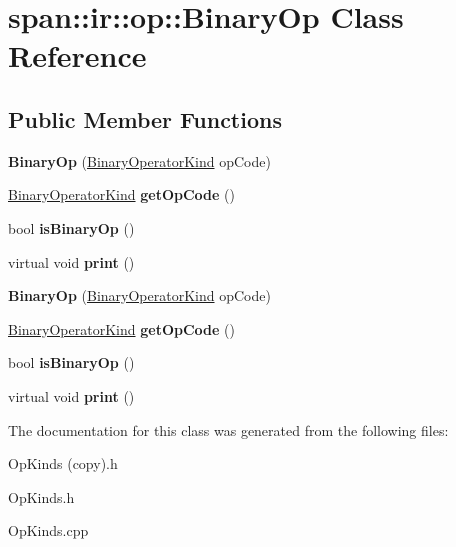 \hypertarget{classspan_1_1ir_1_1op_1_1BinaryOp}{}\section{span\+:\+:ir\+:\+:op\+:\+:Binary\+Op Class Reference}
\label{classspan_1_1ir_1_1op_1_1BinaryOp}
\subsection*{Public Member Functions}
\begin{DoxyCompactItemize}
\item 
\mbox{\label{classspan_1_1ir_1_1op_1_1BinaryOp_aac42587a58c175f840f119b184bdc250}} 
{\bfseries Binary\+Op} (\hyperlink{namespacespan_1_1ir_1_1op_a5741ac4595bea9e1d2821a8bb5d953e3}{Binary\+Operator\+Kind} op\+Code)
\item 
\mbox{\label{classspan_1_1ir_1_1op_1_1BinaryOp_ae9fc989c0f406db410535a824ef71028}} 
\hyperlink{namespacespan_1_1ir_1_1op_a5741ac4595bea9e1d2821a8bb5d953e3}{Binary\+Operator\+Kind} {\bfseries get\+Op\+Code} ()
\item 
\mbox{\label{classspan_1_1ir_1_1op_1_1BinaryOp_a93194b945a4a2f493e5c0069348195f2}} 
bool {\bfseries is\+Binary\+Op} ()
\item 
\mbox{\label{classspan_1_1ir_1_1op_1_1BinaryOp_ab7f1b0bab1b165b55029ad301b451d1a}} 
virtual void {\bfseries print} ()
\item 
\mbox{\label{classspan_1_1ir_1_1op_1_1BinaryOp_a77243bf71dc8804399c6538967b997e7}} 
{\bfseries Binary\+Op} (\hyperlink{namespacespan_1_1ir_1_1op_a5741ac4595bea9e1d2821a8bb5d953e3}{Binary\+Operator\+Kind} op\+Code)
\item 
\mbox{\label{classspan_1_1ir_1_1op_1_1BinaryOp_a1c8100abfd5c7e170574a2530fa803a2}} 
\hyperlink{namespacespan_1_1ir_1_1op_a5741ac4595bea9e1d2821a8bb5d953e3}{Binary\+Operator\+Kind} {\bfseries get\+Op\+Code} ()
\item 
\mbox{\label{classspan_1_1ir_1_1op_1_1BinaryOp_a12e6254c67f4a658bd6a1263c37906c9}} 
bool {\bfseries is\+Binary\+Op} ()
\item 
\mbox{\label{classspan_1_1ir_1_1op_1_1BinaryOp_a2e0aadebeee7051b1fbbd876b73ca7df}} 
virtual void {\bfseries print} ()
\end{DoxyCompactItemize}


The documentation for this class was generated from the following files\+:\begin{DoxyCompactItemize}
\item 
Op\+Kinds (copy).\+h\item 
Op\+Kinds.\+h\item 
Op\+Kinds.\+cpp\end{DoxyCompactItemize}
